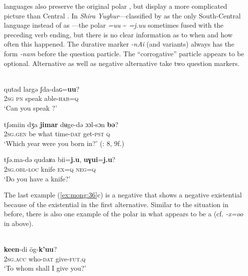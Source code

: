 \textbf{} languages also preserve the original polar , but display a more complicated picture than Central . In \textit{Shira Yughur}---classified by \citet{Rybatzki2003b} as the only South-Central language instead of as ---the polar  \textit{=uu} {\textasciitilde} \textit{=j.uu} sometimes fused with the preceding verb ending, but there is no clear information as to when and how often this happened. The durative marker \textit{-nAi} (and variants) always has the form \textit{-nam} before the question particle. The “corrogative” particle appears to be optional. Alternative as well as negative alternative  take two question markers.

\newpage 
\ea%
    \label{ex:mong:36}
    \\
    \ea
     {qutad} largə  ʃda-daɢ=\textbf{{u}}\textbf{{u}}?\\
    2\textsc{sg}  \textsc{pn}  speak  able-\textsc{hab}=\textsc{q}\\
    \glt ‘Can you speak ?’
    
    \ex
    \gll tʃəmiin    dʒa \textbf{{jimar}} dʉge-də  ɔɔl-sɔn \textbf{{b}}\textbf{{ə}}?\\
    2\textsc{sg}.\textsc{gen} be  what  time-\textsc{dat}  get-\textsc{pst}   \textsc{q}\\
    \glt ‘Which year were you born in?’ (\citealt{Chaolu1994a}: 8, 9f.)
    
    \ex
    \gll tʃə.ma-də  qudaʁa    bii=\textbf{{j.u}}, \textbf{{uɣui}}{=}\textbf{{j.u}}?\\
    2\textsc{sg}.\textsc{obl}-\textsc{loc}  knife    \textsc{ex}=\textsc{q}    \textsc{neg}=\textsc{q}\\
    \glt ‘Do you have a knife?’ \citep[58]{Zhaonasitu1981b}
    \z
    \z 

\noindent The last example (\ref{ex:mong:36}c) is a negative  that shows a negative existential because of the existential in the first alternative. Similar to the situation in  before, there is also one example of the polar  in what appears to be a  (cf.  \textit{-x=oo} in  above).

\ea%
    \label{ex:mong:37}
    \\
     \textbf{{keen}}-di ög-\textbf{{k’uu}}?\\
    2\textsc{sg}.\textsc{acc}  who-\textsc{dat}  give-\textsc{fut}.\textsc{q}\\
    \glt ‘To whom shall I give you?’ \citep[280]{Nugteren2003}
    \z

